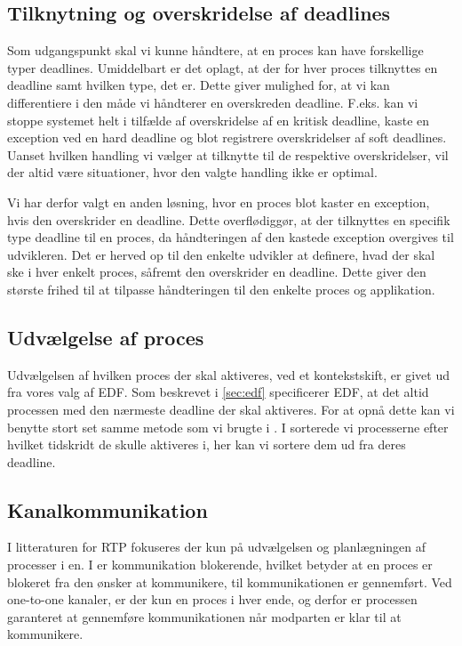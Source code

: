 \subsection{Tilknytning og overskridelse af deadlines}
Som udgangspunkt skal vi kunne håndtere, at en proces kan have forskellige typer deadlines. Umiddelbart er det oplagt, at der for hver proces tilknyttes en deadline samt hvilken type, det er. Dette giver mulighed for, at vi kan differentiere i den måde vi håndterer en overskreden deadline. F.eks. kan vi stoppe systemet helt i tilfælde af overskridelse af en kritisk deadline, kaste en exception ved en hard deadline og blot registrere overskridelser af soft deadlines. Uanset hvilken handling vi vælger at tilknytte til de respektive overskridelser, vil der altid være situationer, hvor den valgte handling ikke er optimal. 

Vi har derfor valgt en anden løsning, hvor en proces blot kaster en exception, hvis den overskrider en deadline. Dette overflødiggør, at der tilknyttes en specifik type deadline til en proces, da håndteringen af den kastede exception overgives til udvikleren. Det er herved op til den enkelte udvikler at definere, hvad der skal ske i hver enkelt proces, såfremt den overskrider en deadline. Dette giver den største frihed til at tilpasse håndteringen til den enkelte proces og applikation. 

\subsection{Udvælgelse af proces}
Udvælgelsen af hvilken proces der skal aktiveres, ved et kontekstskift, er givet ud fra vores valg af EDF. Som beskrevet i \cref{sec:edf} specificerer EDF, at det altid processen med den nærmeste deadline der skal aktiveres. For at opnå dette kan vi benytte stort set samme metode som vi brugte i \des. I \des sorterede vi processerne efter hvilket tidskridt de skulle aktiveres i, her kan vi sortere dem ud fra deres deadline.  

\subsection{Kanalkommunikation}\label{sec:rtp-kommunikation}
I litteraturen for  RTP fokuseres der kun på udvælgelsen og planlægningen af processer i \sched en. I \pycsp er kommunikation blokerende, hvilket betyder at en proces er  blokeret fra den ønsker at kommunikere, til kommunikationen er gennemført. Ved one-to-one kanaler, er der kun en proces i hver ende, og derfor er processen garanteret at gennemføre kommunikationen når modparten er klar til at kommunikere.

